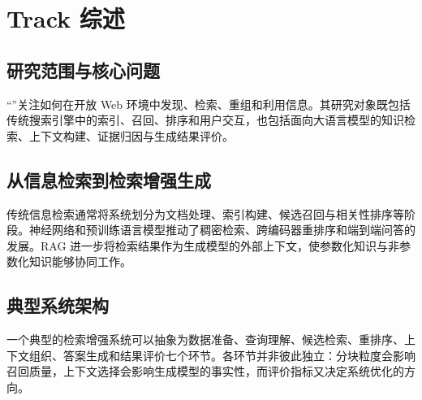 \section{Track 综述}


\subsection{研究范围与核心问题}

“\TrackNameEN”关注如何在开放 Web 环境中发现、检索、重组和利用信息。其研究对象既包括传统搜索引擎中的索引、召回、排序和用户交互，也包括面向大语言模型的知识检索、上下文构建、证据归因与生成结果评价。


\subsection{从信息检索到检索增强生成}

传统信息检索通常将系统划分为文档处理、索引构建、候选召回与相关性排序等阶段。神经网络和预训练语言模型推动了稠密检索、跨编码器重排序和端到端问答的发展。RAG 进一步将检索结果作为生成模型的外部上下文，使参数化知识与非参数化知识能够协同工作\parencite{gao2023rag}。


\subsection{典型系统架构}

一个典型的检索增强系统可以抽象为数据准备、查询理解、候选检索、重排序、上下文组织、答案生成和结果评价七个环节。各环节并非彼此独立：分块粒度会影响召回质量，上下文选择会影响生成模型的事实性，而评价指标又决定系统优化的方向。

